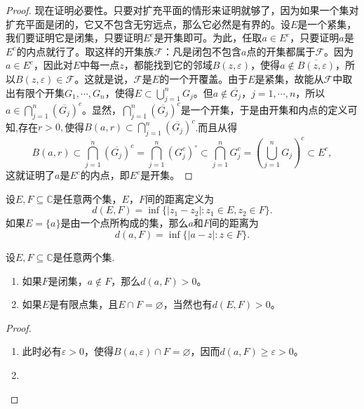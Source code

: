\documentclass[../../main.tex]{subfiles}%
\begin{document}
\begin{proof}
现在证明必要性。只要对扩充平面的情形来证明就够了，因为如果一个集对扩充平面是闭的，它又不包含无穷远点，那么它必然是有界的。设\(E\)是一个紧集，我们要证明它是闭集，只要证明\(E^c\)是开集即可。为此，任取\(a \in E^c\)，只要证明\(a\)是\(E^c\)的内点就行了。取这样的开集族\(\mathscr{F}\)：凡是闭包不包含\(a\)点的开集都属于\(\mathscr{F}\)。因为\(a \in E^c\)，因此对\(E\)中每一点\(z\)，都能找到它的邻域\(B(z, \varepsilon)\)，使得\(a \notin \overline{B(z, \varepsilon)}\)，所以\(B(z, \varepsilon) \in \mathscr{F}\)。这就是说，\(\mathscr{F}\)是\(E\)的一个开覆盖。由于\(E\)是紧集，故能从\(\mathscr{F}\)中取出有限个开集\(G_1, \cdots, G_n\)，使得\(E \subset \bigcup_{j = 1}^n G_j\)。但\(a \notin \overline{G_j}\)，\(j = 1, \cdots, n\)，所以\(a \in \bigcap_{j = 1}^n (\overline{G_j})^c\)。显然，\(\bigcap_{j = 1}^n (\overline{G_j})^c\)是一个开集，于是由开集和内点的定义可知,存在$r>0,$使得$B(a,r)\subset \bigcap_{j = 1}^n (\overline{G_j})^c$.而且从得
\[
B(a,r)\subset \bigcap_{j = 1}^n (\overline{G_j})^c = \bigcap_{j = 1}^n (G_j^c)^\circ \subset \bigcap_{j = 1}^n G_j^c = \left( \bigcup_{j = 1}^n G_j \right)^c \subset E^c,
\]
这就证明了\(a\)是\(E^c\)的内点，即\(E^c\)是开集。

\end{proof}

\begin{definition}
设\(E,F\subseteq \mathbb{C}\)是任意两个集，\(E\)，\(F\)间的距离定义为
\[
d(E, F) = \inf\{ | z_1 - z_2 | : z_1 \in E, z_2 \in F \}.
\]
如果\(E = \{ a \}\)是由一个点所构成的集，那么\(a\)和\(F\)间的距离为
\[
d(a, F) = \inf\{ | a - z | : z \in F \}.
\]
\end{definition}

\begin{proposition}
设\(E,F\subseteq \mathbb{C}\)是任意两个集.
\begin{enumerate}[(1)]
\item 如果\(F\)是闭集，\(a \notin F\)，那么\(d(a, F) > 0\)。

\item 如果\(E\)是有限点集，且\(E \cap F = \varnothing\)，当然也有\(d(E, F) > 0\)。
\end{enumerate}
\end{proposition}
\begin{proof}
\begin{enumerate}[(1)]
\item 此时必有\(\varepsilon > 0\)，使得\(B(a, \varepsilon) \cap F = \varnothing\)，因而\(d(a, F) \geqslant \varepsilon > 0\)。

\item 
\end{enumerate}

\end{proof}
\end{document}
